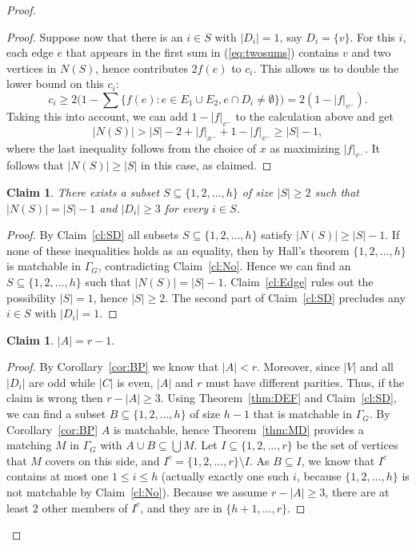 \documentclass{article}
\newtheorem{claim}[theorem]{Claim}
\theoremstyle{definition}
\begin{document}
\begin{proof}
\begin{proof}
Suppose now that there is an $i \in S$ with $|D_i| = 1$, say $D_i = \{v\}$. For this $i$, each edge $e$ that appears in the first sum in (\ref{eq:twosums}) contains $v$ and two vertices in $N(S)$, hence contributes $2f(e)$ to $c_i$. This allows us to double the lower bound on this $c_i$: \[ c_i \ge 2 \bigl( 1 - \sum \{ f(e): e \in E_1 \cup E_2, e \cap D_i \ne \emptyset \}\bigr) = 2 (1 - |f|_{v^-}).\] Taking this into account, we can add $1 - |f|_{v^-}$ to the calculation above and get \[ |N(S)| > |S| - 2 + |f|_{x^-} + 1 - |f|_{v^-} \ge |S| - 1,\] where the last inequality follows from the choice of $x$ as maximizing $|f|_{v^-}$. It follows that $|N(S)| \ge |S|$ in this case, as claimed.
\end{proof}
\begin{claim} \label{cl:One}
There exists a subset $S \subseteq \{1,2, \ldots , h\}$ of size $|S| \ge 2$ such that $|N(S)| = |S| - 1$ and $|D_i| \ge 3$ for every $i \in S$.
\end{claim}
\begin{proof} By Claim~\ref{cl:SD} all subsets $S \subseteq \{1,2, \ldots , h\}$ satisfy $|N(S)| \ge |S| - 1$. If none of these inequalities holds as an equality, then by Hall's theorem $\{1,2, \ldots , h\}$ is matchable in $\Gamma_G$, contradicting Claim~\ref{cl:No}. Hence we can find an $S \subseteq \{1,2, \ldots , h\}$ such that $|N(S)| = |S| - 1$. Claim~\ref{cl:Edge} rules out the possibility $|S| = 1$, hence $|S| \ge 2$. The second part of Claim~\ref{cl:SD} precludes any $i \in S$ with $|D_i| = 1$.
\end{proof}
\begin{claim} \label{cl:Ar}
$|A| = r - 1.$
\end{claim}
\begin{proof} By Corollary~\ref{cor:BP} we know that $|A| < r$. Moreover, since $|V|$ and all $|D_i|$ are odd while $|C|$ is even, $|A|$ and $r$ must have different parities. Thus, if the claim is wrong then $r - |A| \ge 3$. Using Theorem~\ref{thm:DEF} and Claim~\ref{cl:SD}, we can find a subset $B \subseteq \{1,2, \ldots , h\}$ of size $h-1$ that is matchable in $\Gamma_G$. By Corollary~\ref{cor:BP} $A$ is matchable, hence Theorem~\ref{thm:MD} provides a matching $M$ in $\Gamma_G$ with $A \cup B \subseteq \bigcup M$. Let $I \subseteq \{1,2, \ldots , r\}$ be the set of vertices that $M$ covers on this side, and $I^c = \{1,2, \ldots , r\} \setminus I$. As $B \subseteq I$, we know that $I^c$ contains at most one $1 \le i \le h$ (actually exactly one such $i$, because $\{1,2, \ldots , h\}$ is not matchable by Claim~\ref{cl:No}). Because we assume $r - |A| \ge 3$, there are at least $2$ other members of $I^c$, and they are in $\{h+1, \ldots , r\}$.


\end{proof}
\end{proof}
\end{document}
